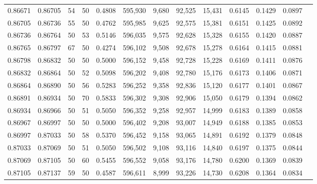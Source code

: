 \begin{tabular}{rrrrrrrrrrrrr}
0.86671 & 0.86705 &    54 &  50 &                                     0.4808 & 595,930 &   9,680 &  92,525 &  15,431 & 0.6145 & 0.1429 & 0.0897 \\
0.86705 & 0.86736 &    55 &  50 &                                     0.4762 & 595,985 &   9,625 &  92,575 &  15,381 & 0.6151 & 0.1425 & 0.0892 \\
0.86736 & 0.86764 &    50 &  53 &                                     0.5146 & 596,035 &   9,575 &  92,628 &  15,328 & 0.6155 & 0.1420 & 0.0887 \\
0.86765 & 0.86797 &    67 &  50 &                                     0.4274 & 596,102 &   9,508 &  92,678 &  15,278 & 0.6164 & 0.1415 & 0.0881 \\
0.86798 & 0.86832 &    50 &  50 &                                     0.5000 & 596,152 &   9,458 &  92,728 &  15,228 & 0.6169 & 0.1411 & 0.0876 \\
0.86832 & 0.86864 &    50 &  52 &                                     0.5098 & 596,202 &   9,408 &  92,780 &  15,176 & 0.6173 & 0.1406 & 0.0871 \\
0.86864 & 0.86890 &    50 &  56 &                                     0.5283 & 596,252 &   9,358 &  92,836 &  15,120 & 0.6177 & 0.1401 & 0.0867 \\
0.86891 & 0.86934 &    50 &  70 &                                     0.5833 & 596,302 &   9,308 &  92,906 &  15,050 & 0.6179 & 0.1394 & 0.0862 \\
0.86934 & 0.86966 &    50 &  51 &                                     0.5050 & 596,352 &   9,258 &  92,957 &  14,999 & 0.6183 & 0.1389 & 0.0858 \\
0.86967 & 0.86997 &    50 &  50 &                                     0.5000 & 596,402 &   9,208 &  93,007 &  14,949 & 0.6188 & 0.1385 & 0.0853 \\
0.86997 & 0.87033 &    50 &  58 &                                     0.5370 & 596,452 &   9,158 &  93,065 &  14,891 & 0.6192 & 0.1379 & 0.0848 \\
0.87033 & 0.87069 &    50 &  51 &                                     0.5050 & 596,502 &   9,108 &  93,116 &  14,840 & 0.6197 & 0.1375 & 0.0844 \\
0.87069 & 0.87105 &    50 &  60 &                                     0.5455 & 596,552 &   9,058 &  93,176 &  14,780 & 0.6200 & 0.1369 & 0.0839 \\
0.87105 & 0.87137 &    59 &  50 &                                     0.4587 & 596,611 &   8,999 &  93,226 &  14,730 & 0.6208 & 0.1364 & 0.0834 \\

\end{tabular}
